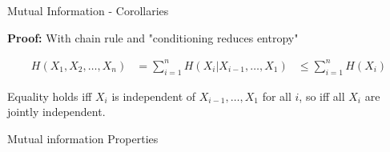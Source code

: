 \documentclass[11pt,compress,t,notes=noshow, xcolor=table]{beamer}
\begin{document}
\begin{vbframe}{Mutual Information - Corollaries}
\lz

\textbf{Proof:} With chain rule and "conditioning reduces entropy"

\footnotesize
\begin{equation*}
\begin{aligned}
H\left(X_{1}, X_{2}, \ldots, X_{n}\right) &=\sum_{i=1}^{n} H\left(X_{i} | X_{i-1}, \ldots, X_{1}\right) 
&\leq \sum_{i=1}^{n} H\left(X_{i}\right)
\end{aligned}
\end{equation*}
\normalsize


Equality holds iff $X_i$ is independent of 
$X_{i-1},\ldots, X_1$ for all $i$,
so iff all $X_i$ are jointly independent.


\end{vbframe}

\begin{vbframe} {Mutual information Properties}











\end{vbframe}
\end{document}
